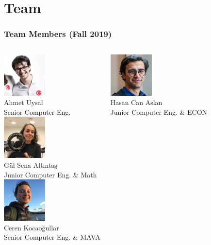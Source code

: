   \section{Team}
    \begin{frame}
      \frametitle{Team Members (Fall 2019)}
      \begin{columns}
				\column{5cm}
				\centering 
					\includegraphics[width=2.25cm]{images/ahmet.jpg}\\
					Ahmet Uysal\\
					Senior Computer Eng.\\

          \includegraphics[width=2.25cm]{images/gulsena.jpg}\\
					Gül Sena Altıntaş\\
					Junior Computer Eng. \& Math\\
				\column{5cm}
				\centering
					\includegraphics[width=2.25cm]{images/ceren.jpg}\\
					Ceren Kocaoğullar\\
					Senior Computer Eng. \& MAVA
          
          \includegraphics[width=2.25cm]{images/hasancan.jpg}\\
					Hasan Can Aslan\\
					Junior Computer Eng. \& ECON
			\end{columns}
    
    \end{frame}



